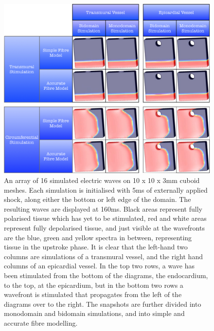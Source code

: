     \begin{figure}[htbp]
  		\centering
  	    \includegraphics[width=1\textwidth]{Ch4/Figs/planar_propagation_1}
              \caption{An array of 16 simulated electric waves on 10 x 10 x 3mm cuboid meshes. Each simulation is initialised with 5ms of externally applied shock, along either the bottom or left edge of the domain. The resulting waves are displayed at 160ms. Black areas represent fully polarised tissue which has yet to be stimulated, red and white areas represent fully depolarised tissue, and just visible at the wavefronts are the blue, green and yellow spectra in between, representing tissue in the upstroke phase. It is clear that the left-hand two columns are simulations of a transmural vessel, and the right hand columns of an epicardial vessel. In the top two rows, a wave has been stimulated from the bottom of the diagrams, the endocardium, to the top, at the epicardium, but in the bottom two rows a wavefront is stimulated that propagates from the left of the diagrams over to the right. The snapshots are further divided into monodomain and bidomain simulations, and into simple and accurate fibre modelling.}
  	  \label{fig:planar_propagation_1}
  	\end{figure}
    
